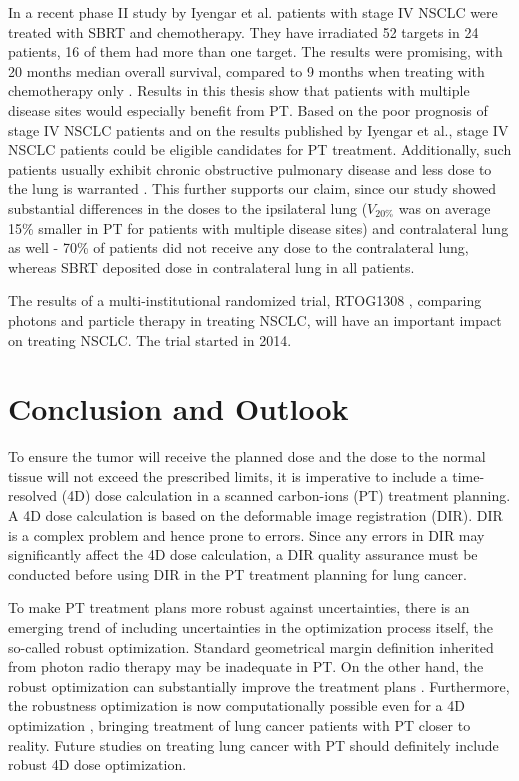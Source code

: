In a recent phase II study by Iyengar et al. \cite{Iyengar2014} patients with stage IV NSCLC were treated with SBRT and chemotherapy. 
They have irradiated 52 targets in 24 patients, 16 of them had more than one target. The results were promising, with 20 months median overall survival, 
compared to 9 months when treating with chemotherapy only \cite{Tsao2008}. Results in this thesis show that patients with multiple disease sites 
would especially benefit from PT. Based on the poor prognosis of stage IV NSCLC patients and on the results published by Iyengar et al.,
stage IV NSCLC patients could be eligible candidates for PT treatment. Additionally, such patients usually exhibit chronic obstructive pulmonary disease and 
less dose to the lung is warranted \cite{Westover2012}. This further supports our claim, since our study showed substantial differences in 
the doses to the ipsilateral lung ($V_{20\%}$ was on average 15\% smaller in PT for patients with multiple disease sites) and 
contralateral lung as well - 70\% of patients did not receive any dose to the contralateral lung, whereas SBRT deposited dose in contralateral lung in all patients.

The results of a multi-institutional randomized trial, RTOG1308 \cite{RTOG1308}, comparing photons and particle therapy in treating NSCLC,
will have an important impact on treating NSCLC. The trial started in 2014.


\chapter{Conclusion and Outlook}



To ensure the tumor will receive the planned dose and the dose to the normal tissue will not exceed the prescribed limits, it is imperative
to include a time-resolved (4D) dose calculation in a scanned carbon-ions (PT) treatment planning. A 4D dose calculation is based on the deformable image registration (DIR).
DIR is a complex problem and hence prone to errors. Since any errors in DIR may significantly affect the 4D dose calculation, a DIR
quality assurance must be conducted before using DIR in the PT treatment planning for lung cancer.

To make PT treatment plans more robust against uncertainties, there is an emerging trend of including uncertainties in the optimization process itself, the so-called robust optimization.
Standard geometrical margin definition inherited from photon radio therapy may be inadequate in PT. On the other hand, 
the robust optimization can substantially improve the treatment plans \cite{Chen2012}. Furthermore, the robustness optimization is 
now computationally possible even for a 4D optimization \cite{Liu2016}, bringing treatment of lung cancer patients with PT closer to reality. Future studies on
treating lung cancer with PT should definitely include robust 4D dose optimization.

